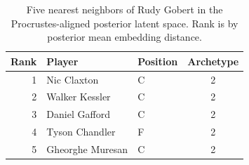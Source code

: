 \begin{table}[htbp]
  \centering\small
  \begin{tabular}{rllc}
    \toprule
    Rank & Player & Position & Archetype \\
    \midrule
    1 & Nic Claxton & C & 2 \\
    2 & Walker Kessler & C & 2 \\
    3 & Daniel Gafford & C & 2 \\
    4 & Tyson Chandler & F & 2 \\
    5 & Gheorghe Muresan & C & 2 \\
    \bottomrule
  \end{tabular}
  \caption{Five nearest neighbors of Rudy Gobert in the Procrustes-aligned posterior latent space. Rank is by posterior mean embedding distance.}
  \label{tab:Rudy_Gobert_neighbors}
\end{table}

